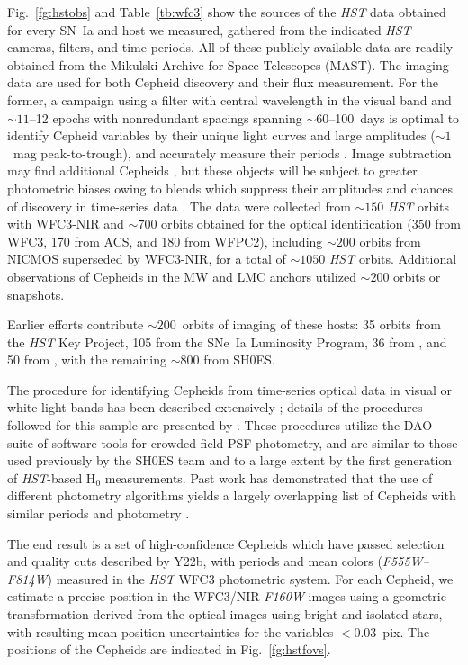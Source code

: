 \documentclass[12pt]{aastex631}
\begin{document}
Fig.~\ref{fg:hstobs} and Table~\ref{tb:wfc3} show the sources of the  {\it HST} data obtained for every SN~Ia and host we measured, gathered from the indicated  {\it HST}  cameras, filters, and time periods. All of these publicly available data are readily obtained from the Mikulski Archive for Space Telescopes (MAST). The imaging data are used for both Cepheid discovery and their flux measurement. For the former, a campaign using a filter with central wavelength in the visual band and $\sim 11$--12 epochs with nonredundant spacings spanning $\sim 60$--100~days is optimal to identify Cepheid variables by their unique light curves and large amplitudes ($\sim 1$~mag peak-to-trough), and accurately measure their periods \citep{madore91,saha96,Stetson:1996}. Image subtraction may find additional Cepheids \citep{Bonanos:2003}, but these objects will be subject to greater photometric biases owing to blends which suppress their amplitudes and chances of discovery in time-series data \citep{Ferrarese:2000}. The data were collected from $\sim 150$ {\it HST} orbits with WFC3-NIR and $\sim 700$ orbits obtained for the optical identification (350 from WFC3, 170 from ACS, and 180 from WFPC2), including $\sim 200$ orbits from NICMOS superseded by WFC3-NIR, for a total of $\sim 1050$ {\it HST}  orbits.  Additional observations of Cepheids in the MW and LMC anchors utilized $\sim 200$ orbits or snapshots.
    
Earlier efforts contribute $\sim 200$~orbits of imaging of these hosts: 35 orbits from the {\it HST} Key Project, 105 from the SNe~Ia Luminosity Program, 36 from \citet{Mager:2013}, and 50 from \citet{macri06}, with the remaining $\sim 800$ from SH0ES.

The procedure for identifying Cepheids from time-series optical data in visual or white light bands has been described extensively \citep{saha96,Stetson:1996,riess05,macri06,Hoffmann:2016}; details of the procedures followed for this sample are presented by \citet{Yuan:2021_SN}.  These procedures utilize the DAO suite of software tools \citep{Stetson:1987,Stetson:1994} for crowded-field PSF photometry, and are similar to those used previously by the SH0ES team \citep{Hoffmann:2016} and to a large extent by the first generation of {\it HST}-based H$_0$ measurements.  Past work has demonstrated that the use of different photometry algorithms yields a largely overlapping list of Cepheids with similar periods and photometry \citep{Ferrarese:1998}.
   
The end result is a set of high-confidence Cepheids which have passed selection and quality cuts described by Y22b, with periods and mean colors ({\it F555W--F814W}) measured in the {\it HST} WFC3 photometric system. For each Cepheid, we estimate a precise position in the WFC3/NIR {\it F160W} images using a geometric transformation derived from the optical images using bright and isolated stars, with resulting mean position uncertainties for the variables $<0.03$~pix.  The positions of the Cepheids are indicated in Fig.~\ref{fg:hstfovs}.
\end{document}
